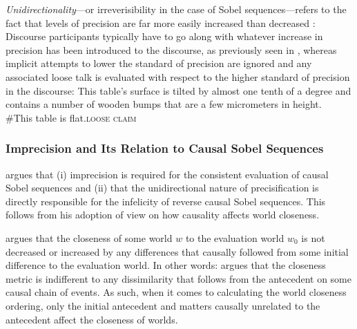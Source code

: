\textit{Unidirectionality}---or irreverisibility in the case of Sobel sequences---refers to the fact that levels of precision are far more easily increased than decreased \parencite{Lewis1979}: Discourse participants typically have to go along with whatever increase in precision has been introduced to the discourse, as previously seen in , whereas implicit attempts to lower the standard of precision are ignored and any associated loose talk is evaluated with respect to the higher standard of precision in the discourse:
\pex{}%
\a{}This table's surface is tilted by almost one tenth of a degree and contains a number of wooden bumps that are a few micrometers in height.\\
\a{}\#This table is flat.\hfill{\scshape loose claim}
\xe

\subsubsection{Imprecision and Its Relation to Causal Sobel Sequences}
\textcite{Klecha2014} argues that (i) imprecision is required for the consistent evaluation of causal Sobel sequences and (ii) that the unidirectional nature of precisification is directly responsible for the infelicity of reverse causal Sobel sequences. This follows from his adoption of  view on how causality affects world closeness.

\textcite{Bennett2003} argues that the closeness of some world $w$ to the evaluation world $w_0$ is not decreased or increased by any differences that causally followed from some initial difference to the evaluation world. In other words: \textcite{Bennett2003} argues that the closeness metric is indifferent to any dissimilarity that follows from the antecedent on some causal chain of events. As such, when it comes to calculating the world closeness ordering, only the initial antecedent and matters causally unrelated to the antecedent affect the closeness of worlds. 

